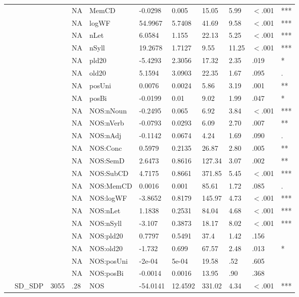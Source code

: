 \begin{table}[ht]
\begin{tabular}{lllllllllll}
   &  &  & NA & MemCD & -0.0298 & 0.005 & 15.05 & 5.99 & $<$.001 & *** \\ 
   &  &  & NA & logWF & 54.9967 & 5.7408 & 41.69 & 9.58 & $<$.001 & *** \\ 
   &  &  & NA & nLet & 6.0584 & 1.155 & 22.13 & 5.25 & $<$.001 & *** \\ 
   &  &  & NA & nSyll & 19.2678 & 1.7127 & 9.55 & 11.25 & $<$.001 & *** \\ 
   &  &  & NA & pld20 & -5.4293 & 2.3056 & 17.32 & 2.35 & .019 & * \\ 
   &  &  & NA & old20 & 5.1594 & 3.0903 & 22.35 & 1.67 & .095 & . \\ 
   &  &  & NA & posUni & 0.0076 & 0.0024 & 5.86 & 3.19 & .001 & ** \\ 
   &  &  & NA & posBi & -0.0199 & 0.01 & 9.02 & 1.99 & .047 & * \\ 
   &  &  & NA & NOS:nNoun & -0.2495 & 0.065 & 6.92 & 3.84 & $<$.001 & *** \\ 
   &  &  & NA & NOS:nVerb & -0.0793 & 0.0293 & 6.09 & 2.70 & .007 & ** \\ 
   &  &  & NA & NOS:nAdj & -0.1142 & 0.0674 & 4.24 & 1.69 & .090 & . \\ 
   &  &  & NA & NOS:Conc & 0.5979 & 0.2135 & 26.87 & 2.80 & .005 & ** \\ 
   &  &  & NA & NOS:SemD & 2.6473 & 0.8616 & 127.34 & 3.07 & .002 & ** \\ 
   &  &  & NA & NOS:SubCD & 4.7175 & 0.8661 & 371.85 & 5.45 & $<$.001 & *** \\ 
   &  &  & NA & NOS:MemCD & 0.0016 & 0.001 & 85.61 & 1.72 & .085 & . \\ 
   &  &  & NA & NOS:logWF & -3.8652 & 0.8179 & 145.97 & 4.73 & $<$.001 & *** \\ 
   &  &  & NA & NOS:nLet & 1.1838 & 0.2531 & 84.04 & 4.68 & $<$.001 & *** \\ 
   &  &  & NA & NOS:nSyll & -3.107 & 0.3873 & 18.17 & 8.02 & $<$.001 & *** \\ 
   &  &  & NA & NOS:pld20 & 0.7797 & 0.5491 & 37.4 & 1.42 & .156 &   \\ 
   &  &  & NA & NOS:old20 & -1.732 & 0.699 & 67.57 & 2.48 & .013 & * \\ 
   &  &  & NA & NOS:posUni & -2e-04 & 5e-04 & 19.58 & .52 & .605 &   \\ 
   &  &  & NA & NOS:posBi & -0.0014 & 0.0016 & 13.95 & .90 & .368 &   \\ 
   & SD\_SDP & 3055 & .28 & NOS & -54.0141 & 12.4592 & 331.02 & 4.34 & $<$.001 & *** \\ 

\end{tabular}
\end{table}
